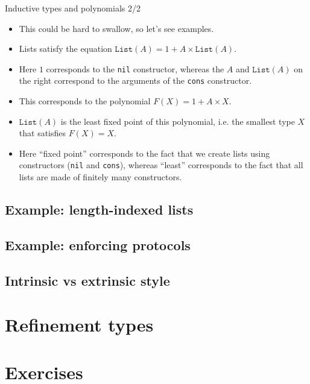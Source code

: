 \documentclass{beamer}
\newcommand{\m}[1]{\texttt{#1}}
\begin{document}
\begin{frame}{Inductive types and polynomials 2/2}
\begin{itemize}
	\item This could be hard to swallow, so let's see examples.
	\item Lists satisfy the equation $\m{List}(A) = 1 + A \times \m{List}(A)$.
	\item Here $1$ corresponds to the \m{nil} constructor, whereas the $A$ and $\m{List}(A)$ on the right correspond to the arguments of the \m{cons} constructor.
	\item This corresponds to the polynomial $F(X) = 1 + A \times X$.
	\item $\m{List}(A)$ is the least fixed point of this polynomial, i.e. the smallest type $X$ that satisfies $F(X) = X$.
	\item Here ``fixed point'' corresponds to the fact that we create lists using constructors (\m{nil} and \m{cons}), whereas ``least'' corresponds to the fact that all lists are made of finitely many constructors.
\end{itemize}
\end{frame}

\subsection{Example: length-indexed lists}

\subsection{Example: enforcing protocols}

\subsection{Intrinsic vs extrinsic style}

\section{Refinement types}

\section{Exercises}
\end{document}

